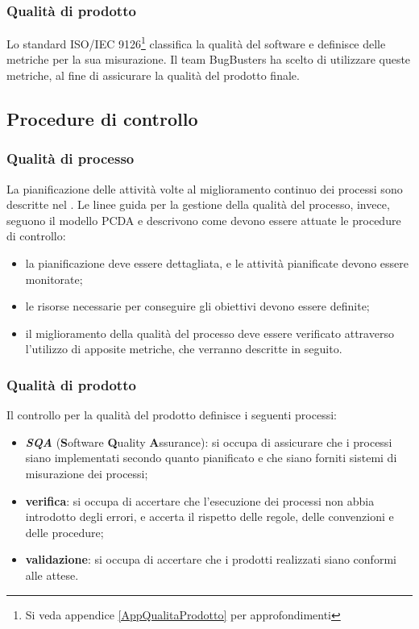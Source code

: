 \subsubsection{Qualità di prodotto}
Lo standard ISO/IEC 9126\footnote{Si veda appendice \ref{AppQualitaProdotto} per approfondimenti} classifica la qualità del software e definisce delle metriche per la sua misurazione. Il team BugBusters ha scelto di utilizzare queste metriche, al fine di assicurare la qualità del prodotto finale.

\subsection{Procedure di controllo}
\subsubsection{Qualità di processo}
La pianificazione delle attività volte al miglioramento continuo dei processi sono descritte nel \PianoDiProgetto. Le linee guida per la gestione della qualità del processo, invece, seguono il modello PCDA e descrivono come devono essere attuate le procedure di controllo:
\begin{itemize}
	\item la pianificazione deve essere dettagliata, e le attività pianificate devono essere monitorate;
	\item le risorse necessarie per conseguire gli obiettivi devono essere definite;
	\item il miglioramento della qualità del processo deve essere verificato attraverso l'utilizzo di apposite metriche, che verranno descritte in seguito.
\end{itemize}

\subsubsection{Qualità di prodotto}
Il controllo per la qualità del prodotto definisce i seguenti processi:
\begin{itemize}
	\item \textit{\textbf{SQA}} (\textbf{S}oftware \textbf{Q}uality \textbf{A}ssurance): si occupa di assicurare che i processi siano implementati secondo quanto pianificato e che siano forniti sistemi di misurazione dei processi;
	\item \textbf{verifica}: si occupa di accertare che l'esecuzione dei processi non abbia introdotto degli errori, e accerta il rispetto delle regole, delle convenzioni e delle procedure;
	\item \textbf{validazione}: si occupa di accertare che i prodotti realizzati siano conformi alle attese.
\end{itemize}

